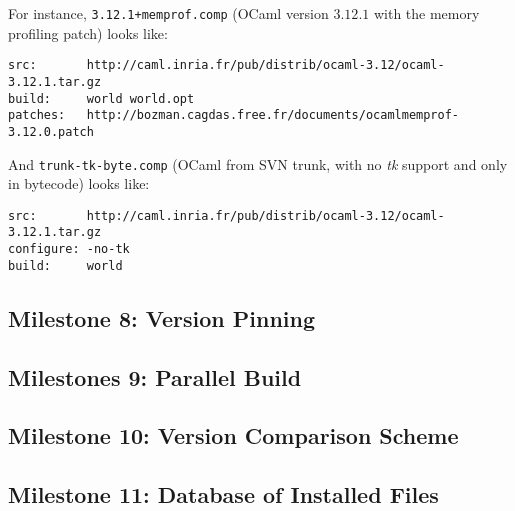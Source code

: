 \documentclass[a4paper,11pt]{article}
\begin{document}
For instance, {\tt 3.12.1+memprof.comp} (OCaml version $3.12.1$ with
the memory profiling patch) looks like:

\begin{verbatim}
src:       http://caml.inria.fr/pub/distrib/ocaml-3.12/ocaml-3.12.1.tar.gz
build:     world world.opt
patches:   http://bozman.cagdas.free.fr/documents/ocamlmemprof-3.12.0.patch
\end{verbatim}

And {\tt trunk-tk-byte.comp} (OCaml from SVN trunk, with no {\em tk}
support and only in bytecode) looks like:

\begin{verbatim}
src:       http://caml.inria.fr/pub/distrib/ocaml-3.12/ocaml-3.12.1.tar.gz
configure: -no-tk
build:     world
\end{verbatim}

\subsection{Milestone 8: Version Pinning}

\subsection{Milestones 9: Parallel Build}

\subsection{Milestone 10: Version Comparison Scheme}

\subsection{Milestone 11: Database of Installed Files}
\end{document}
